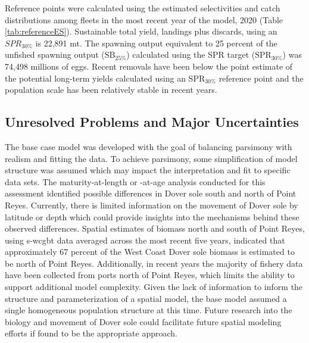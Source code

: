 \documentclass[11pt,
  english,
  a4paper,
]{article}
\begin{document}
Reference points were calculated using the estimated selectivities and catch distributions among fleets in the most recent year of the model, 2020 (Table \ref{tab:referenceES}). Sustainable total yield, landings plus discards, using an {\(SPR_{30\%}\)\leavevmode\tagmcend\tagstructend} is 22,891 mt. The spawning output equivalent to 25 percent of the unfished spawning output ({\(\text{SB}_{25\%}\)\leavevmode\tagmcend\tagstructend}) calculated using the SPR target ({\(\text{SPR}_{30\%}\)\leavevmode\tagmcend\tagstructend}) was 74,498 millions of eggs. Recent removals have been below the point estimate of the potential long-term yields calculated using an {\(\text{SPR}_{30\%}\)\leavevmode\tagmcend\tagstructend} reference point and the population scale has been relatively stable in recent years.

\leavevmode\tagmcend\tagstructend\par


\hypertarget{unresolved-problems-and-major-uncertainties-1}{%
\subsection{Unresolved Problems and Major Uncertainties}\label{unresolved-problems-and-major-uncertainties-1}}

\leavevmode\tagmcend\tagstructend


The base case model was developed with the goal of balancing parsimony with realism and fitting the data. To achieve parsimony, some simplification of model structure was assumed which may impact the interpretation and fit to specific data sets. The maturity-at-length or -at-age analysis conducted for this assessment identified possible differences in Dover sole south and north of Point Reyes. Currently, there is limited information on the movement of Dover sole by latitude or depth which could provide insights into the mechanisms behind these observed differences. Spatial estimates of biomass north and south of Point Reyes, using \gls{s-wcgbt} data averaged across the most recent five years, indicated that approximately 67 percent of the West Coast Dover sole biomass is estimated to be north of Point Reyes. Additionally, in recent years the majority of fishery data have been collected from ports north of Point Reyes, which limits the ability to support additional model complexity. Given the lack of information to inform the structure and parameterization of a spatial model, the base model assumed a single homogeneous population structure at this time. Future research into the biology and movement of Dover sole could facilitate future spatial modeling efforts if found to be the appropriate approach.
\end{document}
